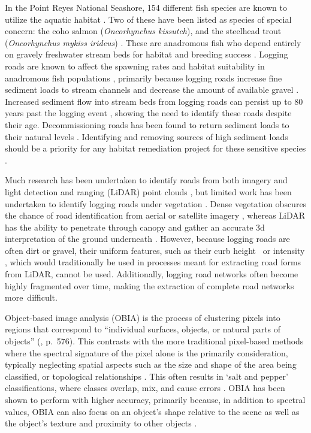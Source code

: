 \documentclass[remotesensing,article,accept,pdftex,moreauthors]{Definitions/mdpi}
\begin{document}
In the Point Reyes National Seashore, 154 different fish species are known to utilize the aquatic habitat \cite{kelly}. Two of these have been listed as species of special concern: the coho salmon ({\it Oncorhynchus kissutch}), and the steelhead trout ({\it Oncorhynchus mykiss irideus}) \cite{ketcham}. These are anadromous fish who depend entirely on gravely freshwater stream beds for habitat and breeding success \cite{gronsdahl}. Logging roads are known to affect the spawning rates and habitat suitability in anadromous fish populations \cite{jacob}, primarily because logging roads increase fine sediment loads to stream channels and decrease the amount of available gravel \cite{baxter}. Increased sediment flow into stream beds from logging roads can persist up to 80 years past the logging event \cite{moore}, showing the need to identify these roads despite their age. Decommissioning roads has been found to return sediment loads to their natural levels \cite{ahnert, douglas}. Identifying and removing sources of high sediment loads should be a priority for any habitat remediation project for these sensitive species \cite{gronsdahl, jacob}.  

Much research has been undertaken to identify roads from both imagery and light detection and ranging (LiDAR) point clouds \cite{li, yong, lillesand, mena, wang, white, yucong}, but limited work has been undertaken to identify logging roads under vegetation \cite{sherba}. Dense vegetation obscures the chance of road identification from aerial or satellite imagery \cite{wang}, whereas LiDAR has the ability to penetrate through canopy and gather an accurate 3d interpretation of the ground underneath \cite{stoker}. However, because logging roads are often dirt or gravel, their uniform features, such as their curb height~\cite{li} or intensity \cite{yong}, which would traditionally be used in processes meant for extracting road forms from LiDAR, cannot be used. Additionally, logging road networks often become highly fragmented over time, making the extraction of complete road networks more~difficult. 

Object-based image analysis (OBIA) is the process of clustering pixels into regions that correspond to “individual surfaces, objects, or natural parts of objects” (\cite{preetha}, p.~576). This contrasts with the more traditional pixel-based methods where the spectral signature of the pixel alone is the primarily consideration, typically neglecting spatial aspects such as the size and shape of the area being classified, or topological relationships \cite{khatami}. This often results in `salt and pepper' classifications, where classes overlap, mix, and cause errors \cite{lu}. OBIA has been shown to perform with higher accuracy, primarily because, in addition to spectral values, OBIA can also focus on an object's shape relative to the scene as well as the object's texture and proximity to other objects \cite{karami}.
\end{document}
